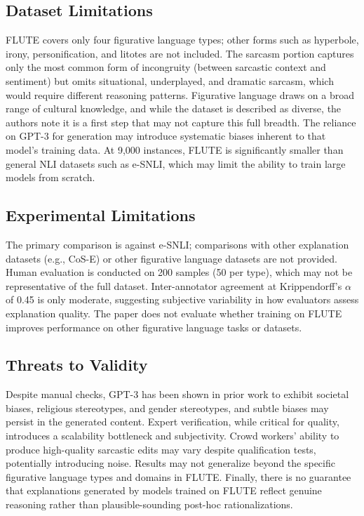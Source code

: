 \documentclass[12pt]{article}
\begin{document}
\subsection{Dataset Limitations}

FLUTE covers only four figurative language types; other forms such as hyperbole, irony, personification, and litotes are not included. The sarcasm portion captures only the most common form of incongruity (between sarcastic context and sentiment) but omits situational, underplayed, and dramatic sarcasm, which would require different reasoning patterns. Figurative language draws on a broad range of cultural knowledge, and while the dataset is described as diverse, the authors note it is a first step that may not capture this full breadth. The reliance on GPT-3 for generation may introduce systematic biases inherent to that model's training data. At 9,000 instances, FLUTE is significantly smaller than general NLI datasets such as e-SNLI, which may limit the ability to train large models from scratch.

\subsection{Experimental Limitations}

The primary comparison is against e-SNLI; comparisons with other explanation datasets (e.g., CoS-E) or other figurative language datasets are not provided. Human evaluation is conducted on 200 samples (50 per type), which may not be representative of the full dataset. Inter-annotator agreement at Krippendorff's $\alpha$ of 0.45 is only moderate, suggesting subjective variability in how evaluators assess explanation quality. The paper does not evaluate whether training on FLUTE improves performance on other figurative language tasks or datasets.

\subsection{Threats to Validity}

Despite manual checks, GPT-3 has been shown in prior work to exhibit societal biases, religious stereotypes, and gender stereotypes, and subtle biases may persist in the generated content. Expert verification, while critical for quality, introduces a scalability bottleneck and subjectivity. Crowd workers' ability to produce high-quality sarcastic edits may vary despite qualification tests, potentially introducing noise. Results may not generalize beyond the specific figurative language types and domains in FLUTE. Finally, there is no guarantee that explanations generated by models trained on FLUTE reflect genuine reasoning rather than plausible-sounding post-hoc rationalizations.
\end{document}
